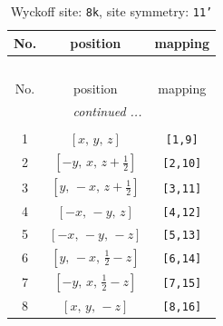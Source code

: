\documentclass[fleqn,8pt]{jsarticle}
\begin{document}
\renewcommand{\arraystretch}{1.2}
\begin{longtable}{ccc}
\caption{Wyckoff site: {\tt 8k}, site symmetry: {\tt 11'}}
 \\
 \hline \hline
No. & position & mapping \\ \hline \endfirsthead

\multicolumn{2}{l}{\tablename\ \thetable{}} \\
 \hline \hline
No. & position & mapping \\ \hline \endhead

 \hline \hline
\multicolumn{2}{r}{\footnotesize\it continued ...} \\ \endfoot

 \hline \hline
\multicolumn{2}{r}{} \\ \endlastfoot

1 & $\left[ x,\, y,\, z \right]$ & {\tt [1,9]} \\ \hline
2 & $\left[ - y,\, x,\, z + \frac{1}{2} \right]$ & {\tt [2,10]} \\ \hline
3 & $\left[ y,\, - x,\, z + \frac{1}{2} \right]$ & {\tt [3,11]} \\ \hline
4 & $\left[ - x,\, - y,\, z \right]$ & {\tt [4,12]} \\ \hline
5 & $\left[ - x,\, - y,\, - z \right]$ & {\tt [5,13]} \\ \hline
6 & $\left[ y,\, - x,\, \frac{1}{2} - z \right]$ & {\tt [6,14]} \\ \hline
7 & $\left[ - y,\, x,\, \frac{1}{2} - z \right]$ & {\tt [7,15]} \\ \hline
8 & $\left[ x,\, y,\, - z \right]$ & {\tt [8,16]} \\
\end{longtable}
\end{document}
